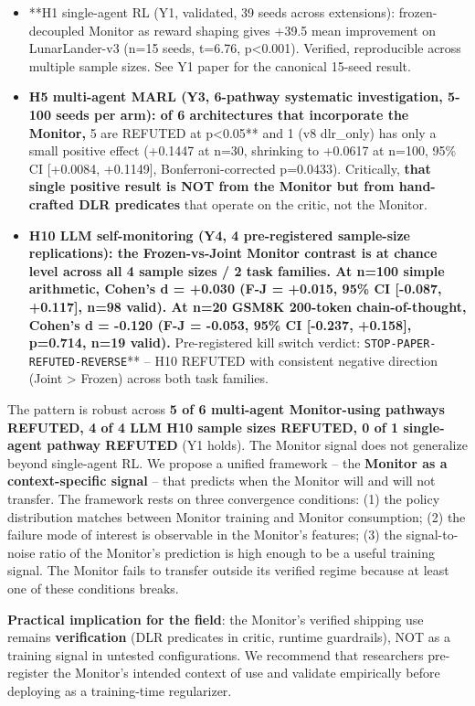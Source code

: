 \documentclass[
]{article}
\providecommand{\tightlist}{%
  \setlength{\itemsep}{0pt}\setlength{\parskip}{0pt}}
\begin{document}
\begin{itemize}
\tightlist
\item
  **H1 single-agent RL (Y1, validated, 39 seeds across extensions):
  frozen-decoupled Monitor as reward shaping gives +39.5 mean
  improvement on LunarLander-v3 (n=15 seeds, t=6.76, p\textless0.001).
  Verified, reproducible across multiple sample sizes. See Y1 paper for
  the canonical 15-seed result.
\item
  \textbf{H5 multi-agent MARL (Y3, 6-pathway systematic investigation,
  5-100 seeds per arm): of 6 architectures that incorporate the Monitor,
  }5 are REFUTED at p\textless0.05** and 1 (v8 dlr\_only) has only a
  small positive effect (+0.1447 at n=30, shrinking to +0.0617 at n=100,
  95\% CI {[}+0.0084, +0.1149{]}, Bonferroni-corrected p=0.0433).
  Critically, \textbf{that single positive result is NOT from the
  Monitor but from hand-crafted DLR predicates} that operate on the
  critic, not the Monitor.
\item
  \textbf{H10 LLM self-monitoring (Y4, 4 pre-registered sample-size
  replications): the Frozen-vs-Joint Monitor contrast is at chance level
  across all 4 sample sizes / 2 task families. At n=100 simple
  arithmetic, Cohen's d = +0.030 (F-J = +0.015, 95\% CI {[}-0.087,
  +0.117{]}, n=98 valid). At n=20 GSM8K 200-token chain-of-thought,
  Cohen's d = -0.120 (F-J = -0.053, 95\% CI {[}-0.237, +0.158{]},
  p=0.714, n=19 valid). }Pre-registered kill switch verdict:
  \texttt{STOP-PAPER-REFUTED-REVERSE}** -- H10 REFUTED with consistent
  negative direction (Joint \textgreater{} Frozen) across both task
  families.
\end{itemize}

The pattern is robust across \textbf{5 of 6 multi-agent Monitor-using
pathways REFUTED, 4 of 4 LLM H10 sample sizes REFUTED, 0 of 1
single-agent pathway REFUTED} (Y1 holds). The Monitor signal does not
generalize beyond single-agent RL. We propose a unified framework -- the
\textbf{Monitor as a context-specific signal} -- that predicts when the
Monitor will and will not transfer. The framework rests on three
convergence conditions: (1) the policy distribution matches between
Monitor training and Monitor consumption; (2) the failure mode of
interest is observable in the Monitor's features; (3) the
signal-to-noise ratio of the Monitor's prediction is high enough to be a
useful training signal. The Monitor fails to transfer outside its
verified regime because at least one of these conditions breaks.

\textbf{Practical implication for the field}: the Monitor's verified
shipping use remains \textbf{verification} (DLR predicates in critic,
runtime guardrails), NOT as a training signal in untested
configurations. We recommend that researchers pre-register the Monitor's
intended context of use and validate empirically before deploying as a
training-time regularizer.
\end{document}
